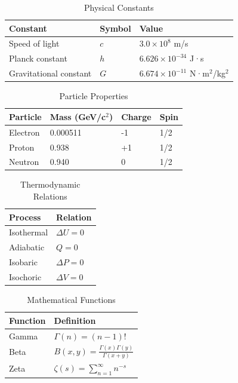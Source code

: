 \documentclass{article}
\begin{document}
\begin{table}[h]
\centering
\caption{Physical Constants}\label{tab:001}
\begin{tabular}{lll}
\hline
Constant & Symbol & Value \\
\hline
Speed of light & $c$ & $3.0 \times 10^8$ m/s \\
Planck constant & $h$ & $6.626 \times 10^{-34}$ J·s \\
Gravitational constant & $G$ & $6.674 \times 10^{-11}$ N·m$^2$/kg$^2$ \\
\hline
\end{tabular}
\end{table}

\begin{table}[h]
\centering
\caption{Particle Properties}\label{tab:002}
\begin{tabular}{llll}
\hline
Particle & Mass (GeV/c$^2$) & Charge & Spin \\
\hline
Electron & 0.000511 & -1 & 1/2 \\
Proton & 0.938 & +1 & 1/2 \\
Neutron & 0.940 & 0 & 1/2 \\
\hline
\end{tabular}
\end{table}

\begin{table}[h]
\centering
\caption{Thermodynamic Relations}\label{tab:003}
\begin{tabular}{ll}
\hline
Process & Relation \\
\hline
Isothermal & $\Delta U = 0$ \\
Adiabatic & $Q = 0$ \\
Isobaric & $\Delta P = 0$ \\
Isochoric & $\Delta V = 0$ \\
\hline
\end{tabular}
\end{table}

\begin{table}[h]
\centering
\caption{Mathematical Functions}\label{tab:004}
\begin{tabular}{ll}
\hline
Function & Definition \\
\hline
Gamma & $\Gamma(n) = (n-1)!$ \\
Beta & $B(x,y) = \frac{\Gamma(x)\Gamma(y)}{\Gamma(x+y)}$ \\
Zeta & $\zeta(s) = \sum_{n=1}^\infty n^{-s}$ \\
\hline
\end{tabular}
\end{table}
\end{document}
